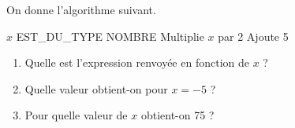 
On donne l'algorithme suivant.

\begin{algobox}
\Variables
\Ligne $x$ EST\_DU\_TYPE NOMBRE
\DebutAlgo
\Ligne Multiplie $x$ par 2
\Ligne Ajoute 5
\FinAlgo
\end{algobox}



\begin{enumerate}
\item Quelle est l'expression renvoyée en fonction de $x$ ?
\item Quelle valeur obtient-on pour $x= -5$ ?
\item Pour quelle valeur de $x$ obtient-on 75 ?
\end{enumerate}

